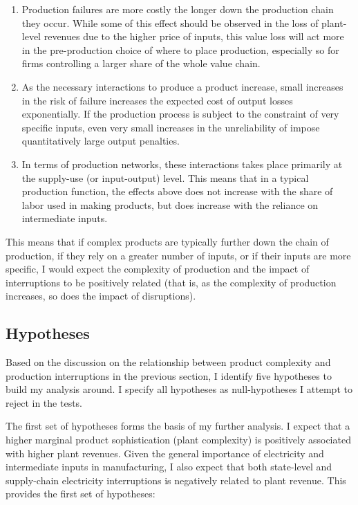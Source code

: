 \documentclass[11pt]{article}
\begin{document}
\begin{enumerate}

\item Production failures are more costly the longer down the production chain they occur. While some of this effect should be observed in the loss of plant-level revenues due to the higher price of inputs, this value loss will act more in the pre-production choice of where to place production, especially so for firms controlling a larger share of the whole value chain.

\item As the necessary interactions to produce a product increase, small increases in the risk of failure increases the expected cost of output losses exponentially. If the production process is subject to the constraint of very specific inputs, even very small increases in the unreliability of impose quantitatively large output penalties.

\item In terms of production networks, these interactions takes place primarily at the supply-use (or input-output) level. This means that in a typical production function, the effects above does not increase with the share of labor used in making products, but does increase with the reliance on intermediate inputs.

\end{enumerate}

This means that if complex products are typically further down the chain of production, if they rely on a greater number of inputs, or if their inputs are more specific, I would expect the complexity of production and the impact of interruptions to be positively related (that is, as the complexity of production increases, so does the impact of disruptions). 


\subsection{Hypotheses}
\label{sub:hyp}
Based on the discussion on the relationship between product complexity and production interruptions in the previous section, I identify five hypotheses to build my analysis around. I specify all hypotheses as null-hypotheses I attempt to reject in the tests. 

The first set of hypotheses forms the basis of my further analysis. I expect that a higher marginal product sophistication (plant complexity) is positively associated with higher plant revenues. Given the general importance of electricity and intermediate inputs in manufacturing, I also expect that both state-level and supply-chain electricity interruptions is negatively related to plant revenue. This provides the first set of hypotheses:
\end{document}
